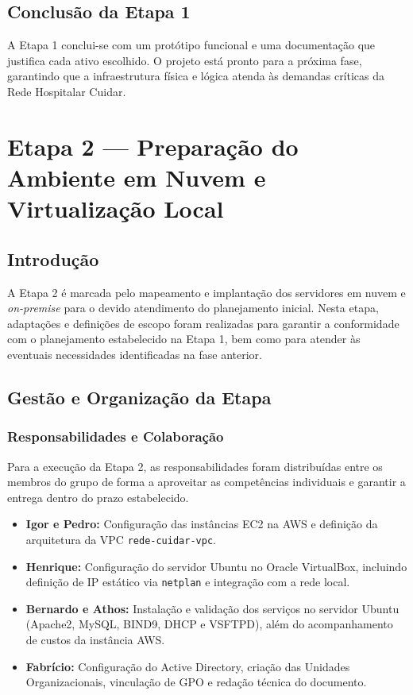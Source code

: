 \documentclass[12pt,a4paper,oneside]{report}
\begin{document}
\section{Conclusão da Etapa 1}
A Etapa 1 conclui-se com um protótipo funcional e uma documentação que justifica cada ativo escolhido. O projeto está pronto para a próxima fase, garantindo que a infraestrutura física e lógica atenda às demandas críticas da Rede Hospitalar Cuidar.

\chapter{Etapa 2 --- Preparação do Ambiente em Nuvem e Virtualização Local}

\section{Introdução}
A Etapa 2 é marcada pelo mapeamento e implantação dos servidores em nuvem e \textit{on-premise} para o devido atendimento do planejamento inicial. Nesta etapa, adaptações e definições de escopo foram realizadas para garantir a conformidade com o planejamento estabelecido na Etapa 1, bem como para atender às eventuais necessidades identificadas na fase anterior.

\section{Gestão e Organização da Etapa}

\subsection{Responsabilidades e Colaboração}
Para a execução da Etapa 2, as responsabilidades foram distribuídas entre os membros do grupo de forma a aproveitar as competências individuais e garantir a entrega dentro do prazo estabelecido.

\begin{itemize}[label=\color{pucblue}$\bullet$]
    \item \textbf{Igor e Pedro:} Configuração das instâncias EC2 na AWS e definição da arquitetura da VPC \texttt{rede-cuidar-vpc}.
    \item \textbf{Henrique:} Configuração do servidor Ubuntu no Oracle VirtualBox, incluindo definição de IP estático via \texttt{netplan} e integração com a rede local.
    \item \textbf{Bernardo e Athos:} Instalação e validação dos serviços no servidor Ubuntu (Apache2, MySQL, BIND9, DHCP e VSFTPD), além do acompanhamento de custos da instância AWS.
    \item \textbf{Fabrício:} Configuração do Active Directory, criação das Unidades Organizacionais, vinculação de GPO e redação técnica do documento.
\end{itemize}
\end{document}

